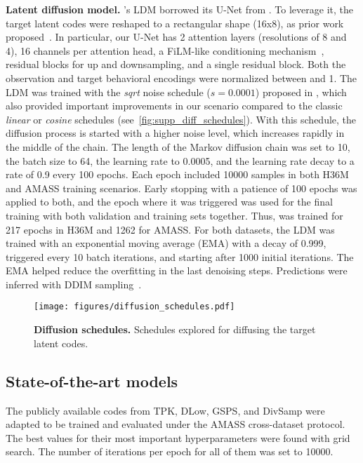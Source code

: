 \documentclass[10pt,twocolumn,letterpaper]{article}
\begin{document}
\textbf{Latent diffusion model.} 
\modelname{}'s LDM borrowed its U-Net from \cite{dhariwal2021diffusionbeatsgans}. To leverage it, the target latent codes were reshaped to a rectangular shape (16x8), as prior work proposed~\cite{bautista2022gaudi}. In particular, our U-Net has 2 attention layers (resolutions of 8 and 4), 16 channels per attention head, a FiLM-like conditioning mechanism~\cite{perez2018film}, residual blocks for up and downsampling, and a single residual block. Both the observation and target behavioral encodings were normalized between  and 1. 
The LDM was trained with the \textit{sqrt} noise schedule ($s=0.0001$) proposed in \cite{li2022diffusionLM}, which also provided important improvements in our scenario compared to the classic \textit{linear} or \textit{cosine} schedules (see~\autoref{fig:supp_diff_schedules}). With this schedule, the diffusion process is started with a higher noise level, which increases rapidly in the middle of the chain.
The length of the Markov diffusion chain was set to 10, the batch size to 64, the learning rate to 0.0005, and the learning rate decay to a rate of 0.9 every 100 epochs. Each epoch included 10000 samples in both H36M and AMASS training scenarios. Early stopping with a patience of 100 epochs was applied to both, and the epoch where it was triggered was used for the final training with both validation and training sets together. Thus, \modelname{} was trained for 217 epochs in H36M and 1262 for AMASS. For both datasets, the LDM was trained with an exponential moving average (EMA) with a decay of 0.999, triggered every 10 batch iterations, and starting after 1000 initial iterations. The EMA helped reduce the overfitting in the last denoising steps. Predictions were inferred with DDIM sampling~\cite{song2021ddim}. 

\begin{figure}[t!]
    \centering
    \texttt{[image: figures/diffusion\_schedules.pdf]}
    \caption{\textbf{Diffusion schedules. } Schedules explored for diffusing the target latent codes.}
    \label{fig:supp_diff_schedules}
\end{figure}

\subsection{State-of-the-art models}
\label{subsec:supp_implementation_sota}

The publicly available codes from TPK, DLow, GSPS, and DivSamp were adapted to be trained and evaluated under the AMASS cross-dataset protocol. The best values for their most important hyperparameters were found with grid search. The number of iterations per epoch for all of them was set to 10000.
\end{document}
